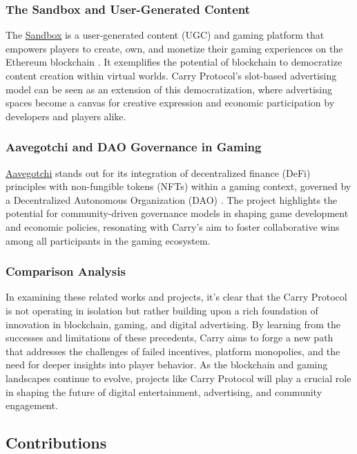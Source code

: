 \subsubsection{The Sandbox and User-Generated Content}

The \href{https://www.sandbox.game/}{Sandbox} is a user-generated content (UGC) and gaming platform that empowers players to create, own, and monetize their gaming experiences on the Ethereum blockchain \cite{truby2020fintech}. It exemplifies the potential of blockchain to democratize content creation within virtual worlds. Carry Protocol's slot-based advertising model can be seen as an extension of this democratization, where advertising spaces become a canvas for creative expression and economic participation by developers and players alike.

\subsubsection{Aavegotchi and DAO Governance in Gaming}

\href{https://aavegotchi.com/}{Aavegotchi} stands out for its integration of decentralized finance (DeFi) principles with non-fungible tokens (NFTs) within a gaming context, governed by a Decentralized Autonomous Organization (DAO) \cite{lin2023survey}. The project highlights the potential for community-driven governance models in shaping game development and economic policies, resonating with Carry's aim to foster collaborative wins among all participants in the gaming ecosystem.

\subsubsection{Comparison Analysis}

In examining these related works and projects, it's clear that the Carry Protocol is not operating in isolation but rather building upon a rich foundation of innovation in blockchain, gaming, and digital advertising. By learning from the successes and limitations of these precedents, Carry aims to forge a new path that addresses the challenges of failed incentives, platform monopolies, and the need for deeper insights into player behavior. As the blockchain and gaming landscapes continue to evolve, projects like Carry Protocol will play a crucial role in shaping the future of digital entertainment, advertising, and community engagement.

\subsection{Contributions}
